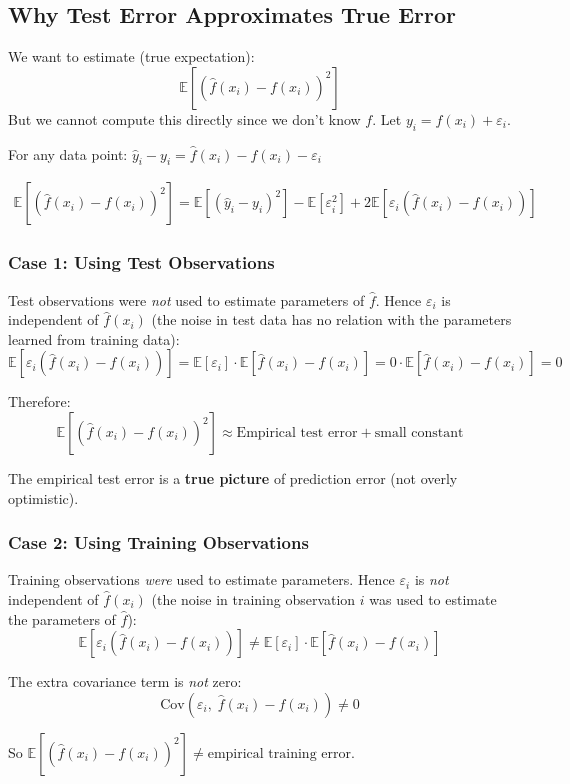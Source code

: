 \documentclass[12pt,a4paper]{article}
\newcommand{\E}{\mathbb{E}}
\newcommand{\Cov}{\mathrm{Cov}}
\begin{document}
\subsection{Why Test Error Approximates True Error}

We want to estimate (true expectation):
\[
\E\!\left[(\hat{f}(x_i) - f(x_i))^2\right]
\]
But we cannot compute this directly since we don't know $f$. Let $y_i = f(x_i) + \varepsilon_i$.

For any data point: $\hat{y}_i - y_i = \hat{f}(x_i) - f(x_i) - \varepsilon_i$

\begin{align*}
\E[(\hat{f}(x_i) - f(x_i))^2]
= \E[(\hat{y}_i - y_i)^2] - \E[\varepsilon_i^2]
+ 2\E[\varepsilon_i(\hat{f}(x_i) - f(x_i))]
\end{align*}

\subsubsection{Case 1: Using Test Observations}

Test observations were \emph{not} used to estimate parameters of $\hat{f}$. Hence $\varepsilon_i$ is independent of $\hat{f}(x_i)$ (the noise in test data has no relation with the parameters learned from training data):
\[
\E[\varepsilon_i(\hat{f}(x_i) - f(x_i))]
= \E[\varepsilon_i]\cdot\E[\hat{f}(x_i) - f(x_i)]
= 0 \cdot \E[\hat{f}(x_i) - f(x_i)]
= 0
\]

Therefore:
\[
\boxed{
\E[(\hat{f}(x_i) - f(x_i))^2]
\approx \text{Empirical test error} + \text{small constant}
}
\]

The empirical test error is a \textbf{true picture} of prediction error (not overly optimistic).

\subsubsection{Case 2: Using Training Observations}

Training observations \emph{were} used to estimate parameters. Hence $\varepsilon_i$ is \emph{not} independent of $\hat{f}(x_i)$ (the noise in training observation $i$ was used to estimate the parameters of $\hat{f}$):
\[
\E[\varepsilon_i(\hat{f}(x_i) - f(x_i))]
\neq \E[\varepsilon_i]\cdot\E[\hat{f}(x_i) - f(x_i)]
\]

The extra covariance term is \emph{not} zero:
\[
\Cov(\varepsilon_i,\; \hat{f}(x_i) - f(x_i)) \neq 0
\]

So $\E[(\hat{f}(x_i)-f(x_i))^2] \neq \text{empirical training error}$.
\end{document}
